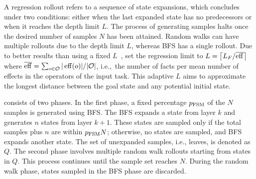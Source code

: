 \documentclass[ppgc,diss,english]{iiufrgs}
\providecommand{\ceil}[1]{\ensuremath{\left\lceil #1\right\rceil}}
\begin{document}
A regression rollout refers to a sequence of state expansions, which concludes under two conditions: either when the last expanded state has no predecessors or when it reaches the depth limit $L$. The process of generating samples halts once the desired number of samples $N$ has been attained. Random walks can have multiple rollouts due to the depth limit $L$, whereas BFS has a single rollout.
Due to better results than using a fixed $L$~\cite{Yu.etal/2020, OToole/2022}, \citet{Bettker.etal/2022} set the regression limit to $L=\ceil{\facts/\overline{\eff}}$ where $\overline{\operatorname{eff}}=\sum_{o\in \mathcal{O}} |\operatorname{eff}(o)|/|\mathcal{O}|$, i.e.,~the number of facts per mean number of effects in the operators of the input task. This adaptive $L$ aims to approximate the longest distance between the goal state and any potential initial state.

\bfsrw consists of two phases. In the first phase, a fixed percentage $p_\text{FSM}$ of the $N$ samples is generated using BFS. The BFS expands a state from layer $k$ and generates $n$ states from layer $k+1$. These states are sampled only if the total samples plus $n$ are within $p_{\text{FSM}}N$; otherwise, no states are sampled, and BFS expands another state. The set of unexpanded samples, i.e., leaves, is denoted as $Q$. The second phase involves multiple random walk rollouts starting from states in $Q$. This process continues until the sample set reaches $N$. During the random walk phase, states sampled in the BFS phase are discarded.

%
\end{document}
